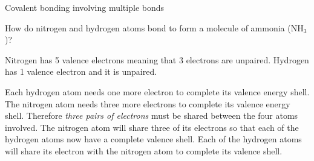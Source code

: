 \begin{wex}{Covalent bonding involving multiple bonds }{
        \label{m38704*id139185}How do nitrogen and hydrogen atoms bond to form a molecule of ammonia ($\mathrm{NH}{}_{3}$)?\par 
        \vspace{5pt} 
}
{
          {
        \label{m38704*id139283}Nitrogen has 5 valence electrons meaning that 3 electrons are unpaired. Hydrogen has 1 valence electron and it is unpaired.\par }
         {
        \label{m38704*id139292}Each hydrogen atom needs one more electron to complete its valence energy shell. The nitrogen atom needs three more electrons to complete its valence energy shell. Therefore \textsl{three pairs of electrons} must be shared between the four atoms involved. The nitrogen atom will share three of its electrons so that each of the hydrogen atoms now have a complete valence shell. Each of the hydrogen atoms will share its electron with the nitrogen atom to complete its valence shell.\par 
    \setcounter{subfigure}{0}
\begin{figure}[H]
\end{figure}}}
\end{wex}
